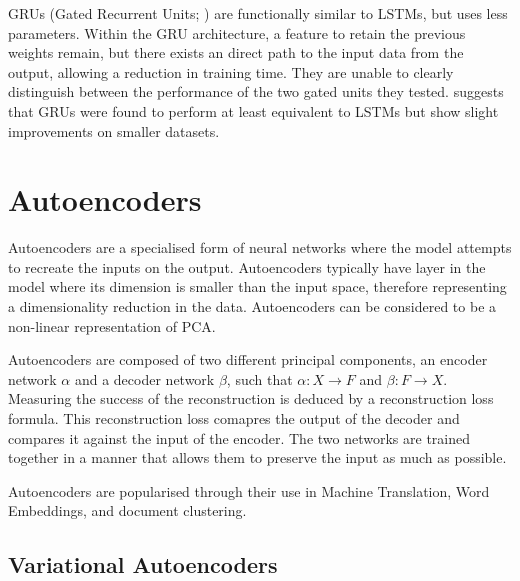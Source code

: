 \documentclass[12pt,twoside]{report}
\begin{document}
GRUs (Gated Recurrent Units; \cite{cho_properties_2014}) are functionally similar to LSTMs, but uses less parameters. Within the GRU architecture, a feature to retain the previous weights remain, but there exists an direct path to the input data from the output, allowing a reduction in training time. They are unable to clearly distinguish between the performance of the two gated units they tested. \cite{chung_empirical_2014} suggests that GRUs were found to perform at least equivalent to LSTMs but show slight improvements on smaller datasets. 

\section{Autoencoders}

Autoencoders are a specialised form of neural networks where the model attempts to recreate the inputs on the output. Autoencoders typically have  layer in the model where its dimension is smaller than the input space, therefore representing a dimensionality reduction in the data. Autoencoders can be considered to be a non-linear representation of PCA.

Autoencoders are composed of two different principal components, an encoder network $\alpha$ and a decoder network $\beta$, such that $\alpha : X \rightarrow F$ and $\beta : F \rightarrow X$. Measuring the success of the reconstruction is deduced by a reconstruction loss formula. This reconstruction loss comapres the output of the decoder and compares it against the input of the encoder. The two networks are trained together in a manner that allows them to preserve the input as much as possible.



Autoencoders are popularised through their use in Machine Translation, Word Embeddings, and document clustering. 

\subsection{Variational Autoencoders}
\end{document}
